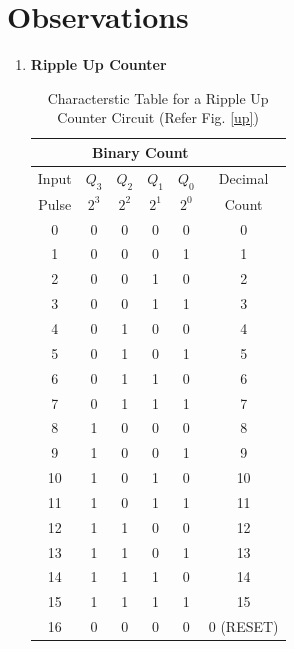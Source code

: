 \section{Observations}

\begin{enumerate}
    \item{\textbf{Ripple Up Counter}}

\begin{table}[H]
    \centering
    \begin{tabular}{|c|c|c|c|c|c|}\hline
          & \multicolumn{4}{c|}{Binary Count} &         \\ \hline
    Input & $Q_3$  & $Q_2$  & $Q_1$  & $Q_0$  & Decimal \\
    Pulse & $2^3$  & $2^2$  & $2^1$  & $2^0$  & Count   \\ \hline
    0     & 0      & 0      & 0      & 0     & 0       \\
    1     & 0      & 0      & 0      & 1     & 1       \\
    2     & 0      & 0      & 1      & 0     & 2       \\
    3     & 0      & 0      & 1      & 1     & 3       \\
    4     & 0      & 1      & 0      & 0     & 4       \\
    5     & 0      & 1      & 0      & 1     & 5       \\
    6     & 0      & 1      & 1      & 0     & 6       \\
    7     & 0      & 1      & 1      & 1     & 7       \\
    8     & 1      & 0      & 0      & 0     & 8       \\
    9     & 1      & 0      & 0      & 1     & 9       \\
    10    & 1      & 0      & 1      & 0     & 10       \\
    11    & 1      & 0      & 1      & 1     & 11       \\
    12    & 1      & 1      & 0      & 0     & 12       \\
    13    & 1      & 1      & 0      & 1     & 13       \\
    14    & 1      & 1      & 1      & 0     & 14       \\
    15    & 1      & 1      & 1      & 1     & 15      \\
    16    & 0      & 0      & 0      & 0     & 0 (RESET)    \\ \hline
    \end{tabular}
    \caption{Characterstic Table for a Ripple Up Counter Circuit (Refer Fig. \ref{up})}
\end{table}


\end{enumerate}
